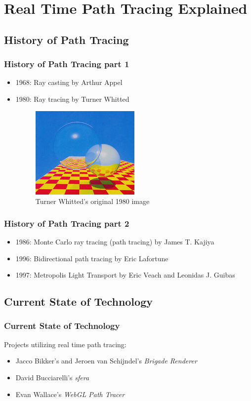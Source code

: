 \documentclass{beamer}
\begin{document}
\section{Real Time Path Tracing Explained}

\subsection{History of Path Tracing}
\begin{frame}
    \frametitle{History of Path Tracing part 1}
    \begin{itemize}
        \item 1968: Ray casting by Arthur Appel
        \item 1980: Ray tracing by Turner Whitted
        \begin{figure}[H]
            \includegraphics[scale=0.8]{early-raytracing-whitted}
            \centering
            \caption{Turner Whitted's original 1980 image}
        \end{figure}
    \end{itemize}
\end{frame}

\begin{frame}
    \frametitle{History of Path Tracing part 2}
    \begin{itemize}
        \item 1986: Monte Carlo ray tracing (path tracing) by James T. Kajiya
        \item 1996: Bidirectional path tracing by Eric Lafortune
        \item 1997: Metropolis Light Transport by Eric Veach and Leonidas J. Guibas
    \end{itemize}
\end{frame}

\subsection{Current State of Technology}
\begin{frame}
    \frametitle{Current State of Technology}
    Projects utilizing real time path tracing:
    \begin{itemize}
        \item Jacco Bikker's and Jeroen van Schijndel's \emph{Brigade Renderer}
        \item David Bucciarelli's \emph{sfera}
        \item Evan Wallace's \emph{WebGL Path Tracer}
    \end{itemize}
\end{frame}
\end{document}
